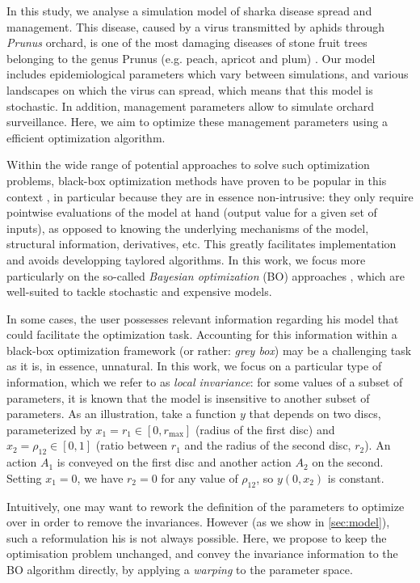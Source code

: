 	In this study, we analyse a simulation model of sharka disease spread and management. This disease, caused by a virus transmitted by aphids through \textit{Prunus} orchard, 
	is one of the most damaging diseases of stone fruit trees belonging to the genus Prunus (e.g. peach, apricot and plum) \cite{cambra2006plum,rimbaud2015sharka}.
	Our model includes epidemiological parameters which vary between simulations, and various landscapes on which the virus can spread, which means that this model is stochastic. 
	In addition, management parameters allow to simulate orchard surveillance. Here, we aim to optimize these management parameters using a efficient optimization algorithm.
	
	Within the wide range of potential approaches to solve such optimization problems, black-box optimization methods have proven to be popular in this context \cite{rios2013derivative}, 
	in particular because they are in essence non-intrusive: they only require pointwise evaluations of the model at hand (output value for a given set of inputs), 
	as opposed to knowing the underlying mechanisms of the model, structural information, derivatives, etc. This greatly facilitates implementation and avoids developping taylored algorithms.
	In this work, we focus more particularly on the so-called \textit{Bayesian optimization} (BO) approaches \cite{mockus2012bayesian,shahriari2016taking},
	which are well-suited to tackle stochastic and expensive models.
	
	In some cases, the user possesses relevant information regarding his model that could facilitate the optimization task.
	Accounting for this information within a black-box optimization framework (or rather: \textit{grey box}) may be a challenging task
	as it is, in essence, unnatural. In this work, we focus on a particular type of information, which we refer to as \textit{local invariance}:
	for some values of a subset of parameters, it is known that the model is insensitive to another subset of parameters. 
	As an illustration, take a function $y$ that depends on two discs, parameterized by $x_1=r_1 \in [0, r_{\max}]$ (radius of the first disc) and $x_2=\rho_{12} \in [0,1]$ 
	(ratio between $r_1$ and the radius of the second disc, $r_2$). An action $A_1$ is conveyed on the first disc and another action $A_2$ on the second.
	Setting $x_1=0$, we have $r_2=0$ for any value of $\rho_{12}$, so $y(0, x_2)$ is constant.
	
	Intuitively, one may want to rework the definition of the parameters to optimize over in order
	to remove the invariances. However (as we show in \ref{sec:model}), such a reformulation his is not always possible.
	Here, we propose to keep the optimisation problem unchanged, and convey the invariance information to the BO algorithm directly, by applying 
	a \textit{warping} \cite{snelson2004warped,snoek2014input} to the parameter space.
	
